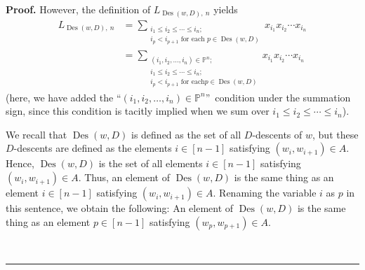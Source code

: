 \documentclass[numbers=enddot,12pt,final,onecolumn,notitlepage]{scrartcl}%
\numberwithin{exer}{section}
\theoremstyle{definition}
\newenvironment{proof}[1][Proof]{\noindent\textbf{#1.} }{\ \rule{0.5em}{0.5em}}
\let\sumnonlimits\sum
\renewcommand{\sum}{\sumnonlimits\limits}
\begin{document}
\begin{proof}
However, the definition of $L_{\operatorname*{Des}\left(  w,D\right)  ,\ n}$
yields%
\begin{align}
L_{\operatorname*{Des}\left(  w,D\right)  ,\ n}  &  =\sum_{\substack{i_{1}\leq
i_{2}\leq\cdots\leq i_{n};\\i_{p}<i_{p+1}\text{ for each }p\in
\operatorname*{Des}\left(  w,D\right)  }}x_{i_{1}}x_{i_{2}}\cdots x_{i_{n}%
}\nonumber\\
&  =\sum_{\substack{\left(  i_{1},i_{2},\ldots,i_{n}\right)  \in\mathbb{P}%
^{n};\\i_{1}\leq i_{2}\leq\cdots\leq i_{n};\\i_{p}<i_{p+1}\text{ for each
}p\in\operatorname*{Des}\left(  w,D\right)  }}x_{i_{1}}x_{i_{2}}\cdots
x_{i_{n}} \label{pf.thm.UX.1.L1}%
\end{align}
(here, we have added the \textquotedblleft$\left(  i_{1},i_{2},\ldots
,i_{n}\right)  \in\mathbb{P}^{n}$\textquotedblright\ condition under the
summation sign, since this condition is tacitly implied when we sum over
$i_{1}\leq i_{2}\leq\cdots\leq i_{n}$).

We recall that $\operatorname*{Des}\left(  w,D\right)  $ is defined as the set
of all $D$-descents of $w$, but these $D$-descents are defined as the elements
$i\in\left[  n-1\right]  $ satisfying $\left(  w_{i},w_{i+1}\right)  \in A$.
Hence, $\operatorname*{Des}\left(  w,D\right)  $ is the set of all elements
$i\in\left[  n-1\right]  $ satisfying $\left(  w_{i},w_{i+1}\right)  \in A$.
Thus, an element of $\operatorname*{Des}\left(  w,D\right)  $ is the same
thing as an element $i\in\left[  n-1\right]  $ satisfying $\left(
w_{i},w_{i+1}\right)  \in A$. Renaming the variable $i$ as $p$ in this
sentence, we obtain the following: An element of $\operatorname*{Des}\left(
w,D\right)  $ is the same thing as an element $p\in\left[  n-1\right]  $
satisfying $\left(  w_{p},w_{p+1}\right)  \in A$.


\end{proof}
\end{document}
